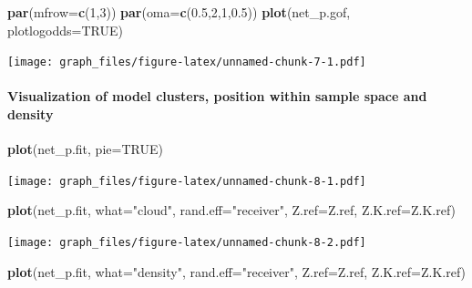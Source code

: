 \documentclass[]{article}
\newenvironment{Shaded}{\begin{snugshade}}{\end{snugshade}}
\newcommand{\DataTypeTok}[1]{\textcolor[rgb]{0.13,0.29,0.53}{#1}}
\newcommand{\DecValTok}[1]{\textcolor[rgb]{0.00,0.00,0.81}{#1}}
\newcommand{\FloatTok}[1]{\textcolor[rgb]{0.00,0.00,0.81}{#1}}
\newcommand{\KeywordTok}[1]{\textcolor[rgb]{0.13,0.29,0.53}{\textbf{#1}}}
\newcommand{\NormalTok}[1]{#1}
\newcommand{\OtherTok}[1]{\textcolor[rgb]{0.56,0.35,0.01}{#1}}
\newcommand{\StringTok}[1]{\textcolor[rgb]{0.31,0.60,0.02}{#1}}
\let\oldparagraph\paragraph
\renewcommand{\paragraph}[1]{\oldparagraph{#1}\mbox{}}
\begin{document}
\begin{Shaded}
\begin{Highlighting}[]
\KeywordTok{par}\NormalTok{(}\DataTypeTok{mfrow=}\KeywordTok{c}\NormalTok{(}\DecValTok{1}\NormalTok{,}\DecValTok{3}\NormalTok{))}
\KeywordTok{par}\NormalTok{(}\DataTypeTok{oma=}\KeywordTok{c}\NormalTok{(}\FloatTok{0.5}\NormalTok{,}\DecValTok{2}\NormalTok{,}\DecValTok{1}\NormalTok{,}\FloatTok{0.5}\NormalTok{))}
\KeywordTok{plot}\NormalTok{(net_p.gof, }\DataTypeTok{plotlogodds=}\OtherTok{TRUE}\NormalTok{)}
\end{Highlighting}
\end{Shaded}

\texttt{[image: graph\_files/figure-latex/unnamed-chunk-7-1.pdf]}

\hypertarget{visualization-of-model-clusters-position-within-sample-space-and-density}{%
\paragraph{Visualization of model clusters, position within sample space
and
density}\label{visualization-of-model-clusters-position-within-sample-space-and-density}}

\begin{Shaded}
\begin{Highlighting}[]
\KeywordTok{plot}\NormalTok{(net_p.fit, }\DataTypeTok{pie=}\OtherTok{TRUE}\NormalTok{)}
\end{Highlighting}
\end{Shaded}

\texttt{[image: graph\_files/figure-latex/unnamed-chunk-8-1.pdf]}

\begin{Shaded}
\begin{Highlighting}[]
\KeywordTok{plot}\NormalTok{(net_p.fit, }\DataTypeTok{what=}\StringTok{"cloud"}\NormalTok{, }\DataTypeTok{rand.eff=}\StringTok{"receiver"}\NormalTok{, }\DataTypeTok{Z.ref=}\NormalTok{Z.ref, }\DataTypeTok{Z.K.ref=}\NormalTok{Z.K.ref)}
\end{Highlighting}
\end{Shaded}

\texttt{[image: graph\_files/figure-latex/unnamed-chunk-8-2.pdf]}

\begin{Shaded}
\begin{Highlighting}[]
\KeywordTok{plot}\NormalTok{(net_p.fit, }\DataTypeTok{what=}\StringTok{"density"}\NormalTok{, }\DataTypeTok{rand.eff=}\StringTok{"receiver"}\NormalTok{, }\DataTypeTok{Z.ref=}\NormalTok{Z.ref, }\DataTypeTok{Z.K.ref=}\NormalTok{Z.K.ref)}
\end{Highlighting}
\end{Shaded}
\end{document}
